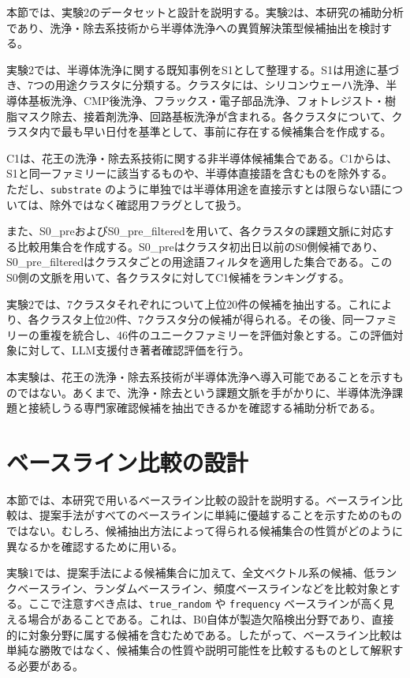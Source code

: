 本節では、実験2のデータセットと設計を説明する。実験2は、本研究の補助分析であり、洗浄・除去系技術から半導体洗浄への異質解決策型候補抽出を検討する。

実験2では、半導体洗浄に関する既知事例をS1として整理する。S1は用途に基づき、7つの用途クラスタに分類する。クラスタには、シリコンウェーハ洗浄、半導体基板洗浄、CMP後洗浄、フラックス・電子部品洗浄、フォトレジスト・樹脂マスク除去、接着剤洗浄、回路基板洗浄が含まれる。各クラスタについて、クラスタ内で最も早い日付を基準として、事前に存在する候補集合を作成する。

C1は、花王の洗浄・除去系技術に関する非半導体候補集合である。C1からは、S1と同一ファミリーに該当するものや、半導体直接語を含むものを除外する。ただし、\texttt{substrate} のように単独では半導体用途を直接示すとは限らない語については、除外ではなく確認用フラグとして扱う。

また、S0\_preおよびS0\_pre\_filteredを用いて、各クラスタの課題文脈に対応する比較用集合を作成する。S0\_preはクラスタ初出日以前のS0側候補であり、S0\_pre\_filteredはクラスタごとの用途語フィルタを適用した集合である。このS0側の文脈を用いて、各クラスタに対してC1候補をランキングする。

実験2では、7クラスタそれぞれについて上位20件の候補を抽出する。これにより、各クラスタ上位20件、7クラスタ分の候補が得られる。その後、同一ファミリーの重複を統合し、46件のユニークファミリーを評価対象とする。この評価対象に対して、LLM支援付き著者確認評価を行う。

本実験は、花王の洗浄・除去系技術が半導体洗浄へ導入可能であることを示すものではない。あくまで、洗浄・除去という課題文脈を手がかりに、半導体洗浄課題と接続しうる専門家確認候補を抽出できるかを確認する補助分析である。

\section{ベースライン比較の設計}

本節では、本研究で用いるベースライン比較の設計を説明する。ベースライン比較は、提案手法がすべてのベースラインに単純に優越することを示すためのものではない。むしろ、候補抽出方法によって得られる候補集合の性質がどのように異なるかを確認するために用いる。

実験1では、提案手法による候補集合に加えて、全文ベクトル系の候補、低ランクベースライン、ランダムベースライン、頻度ベースラインなどを比較対象とする。ここで注意すべき点は、\texttt{true\_random} や \texttt{frequency} ベースラインが高く見える場合があることである。これは、B0自体が製造欠陥検出分野であり、直接的に対象分野に属する候補を含むためである。したがって、ベースライン比較は単純な勝敗ではなく、候補集合の性質や説明可能性を比較するものとして解釈する必要がある。

